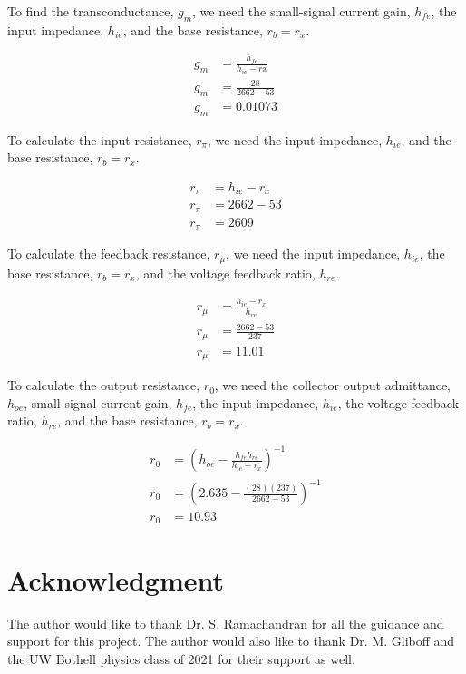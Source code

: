 \documentclass[conference]{IEEEtran}
\begin{document}
To find the transconductance, $g_m$, we need the small-signal current gain, $h_{fe}$, the input impedance, $h_{ie}$,
and the base resistance, $r_b = r_x$.

\begin{equation}
    \begin{aligned}
        g_m &= \frac{h_{fe}}{h_{ie} - rx} \\
        g_m &= \frac{28}{2662 - 53} \\
        g_m &= 0.01073
    \end{aligned}
\end{equation}

To calculate the input resistance, $r_\pi$, we need the input impedance, $h_{ie}$, and the base resistance, $r_b = r_x$.

\begin{equation}
    \begin{aligned}
        r_{\pi} &= h_{ie} - r_x \\
        r_{\pi} &= 2662 - 53 \\
        r_{\pi} &= 2609
    \end{aligned}
\end{equation}

To calculate the feedback resistance, $r_{\mu}$, we need the input impedance, $h_{ie}$, the base resistance, $r_b = r_x$, and
the voltage feedback ratio, $h_{re}$.

\begin{equation}
    \begin{aligned}
        r_{\mu} &= \frac{h_{ie} - r_x}{h_{re}} \\
        r_{\mu} &= \frac{2662 - 53}{237} \\
        r_{\mu} &= 11.01
    \end{aligned}
\end{equation}

To calculate the output resistance, $r_0$, we need the collector output admittance, $h_{oe}$, small-signal current gain, $h_{fe}$,
the input impedance, $h_{ie}$, the voltage feedback ratio, $h_{re}$, and the base resistance, $r_b = r_x$.

\begin{equation}
    \begin{aligned}
        r_0 &= \left(h_{oe} - \frac{h_{fe} h_{re}}{h_{ie} - r_x}\right)^{-1} \\
        r_0 &= \left(2.635 - \frac{(28)(237)}{2662 - 53}\right)^{-1} \\
        r_0 &= 10.93
    \end{aligned}
\end{equation}

\section*{Acknowledgment}

The author would like to thank Dr. S. Ramachandran for all the guidance and support for this project. The author would also like to thank
Dr. M. Gliboff and the UW Bothell physics class of 2021 for their support as well.


{}
\end{document}
